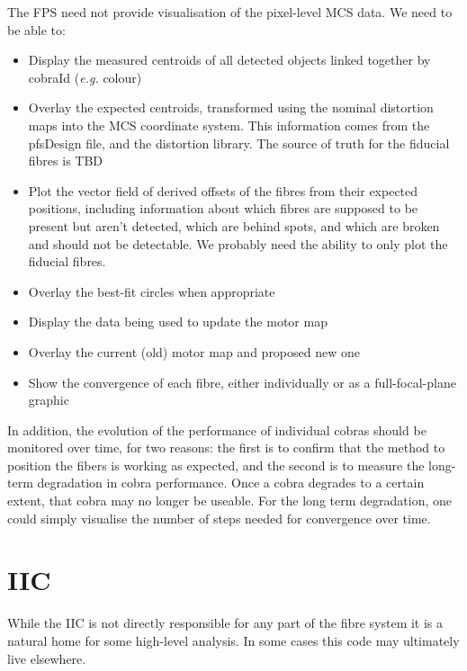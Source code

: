 \documentclass[12pt]{article}
\newcommand{\eg}{\textit{e.g.}\xspace}
\newcommand{\IIC}{\gls{IIC}\xspace}
\newcommand{\MCS}{\gls{MCS}\xspace}
\newcommand{\FPS}{\gls{FPS}\xspace}
\newcommand{\TBD}{\gls{TBD}\xspace}
\begin{document}
The \FPS need not provide visualisation of the pixel-level \MCS data.
We need to be able to:
\begin{itemize}
\item Display the measured centroids of all detected objects linked together by cobraId (\eg colour)  
\item Overlay the expected centroids, transformed using the nominal distortion maps
  into the \MCS coordinate system.
  This information comes from the \gls{pfsDesign} file, and the distortion library. The
  source of truth for the fiducial fibres is \TBD
\item Plot the vector field of derived offsets of the fibres from their expected positions,
  including information about which fibres are supposed to be present but aren't detected,
  which are behind spots, and which are broken and should not be detectable.
  We probably need the ability to only plot the fiducial fibres.
\item
  Overlay the best-fit circles when appropriate
\end{itemize}

\begin{itemize}
\item Display the data being used to update the \gls{motor map}
\item Overlay the current (old) \gls{motor map} and proposed new one
\item Show the convergence of each fibre, either individually or as a full-focal-plane graphic
\end{itemize}

In addition, the evolution of the performance of individual cobras should be monitored over time, for two reasons:
the first is to confirm that the method to position the fibers is working as expected, and the second is to measure
the long-term degradation in cobra performance. Once a cobra degrades to a certain extent, that cobra may no longer be useable. 
For the long term degradation, one could simply visualise the number of steps needed for convergence over time.

\section{IIC}
\label{sec:IIC}

While the \IIC is not directly responsible for any part of the fibre system it is a natural home
for some high-level analysis.  In some cases this code may ultimately live elsewhere.
\end{document}
